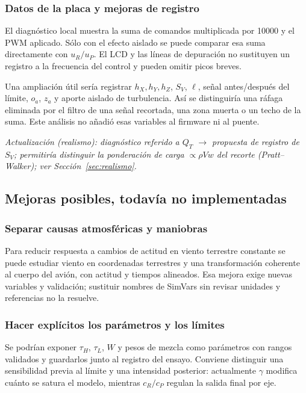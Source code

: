 \documentclass[11pt,a4paper]{article}
\newcommand{\code}[1]{\texttt{\detokenize{#1}}}
\begin{document}
\subsubsection{Datos de la placa y mejoras de registro}
El diagnóstico local \code{f=} muestra la suma de comandos multiplicada por 10000 y \code{p=} el PWM aplicado. Sólo con el efecto aislado se puede comparar esa suma directamente con $u_R/u_P$. El LCD y las líneas de depuración no sustituyen un registro a la frecuencia del control y pueden omitir picos breves.

Una ampliación útil sería registrar $h_X,h_Y,h_Z$, $S_V$, $\ell$, señal antes/después del límite, $o_a$, $z_a$ y aporte aislado de turbulencia. Así se distinguiría una ráfaga eliminada por el filtro de una señal recortada, una zona muerta o un techo de la suma. Este análisis no añadió esas variables al firmware ni al puente.

\textit{Actualización (realismo): diagnóstico referido a $Q_T$ $\rightarrow$ propuesta de registro de $S_V$; permitiría distinguir la ponderación de carga $\propto\rho Vw$ del recorte (Pratt--Walker); ver Sección~\ref{sec:realismo}.}

\subsection{Mejoras posibles, todavía no implementadas}
\subsubsection{Separar causas atmosféricas y maniobras}
Para reducir respuesta a cambios de actitud en viento terrestre constante se puede estudiar viento en coordenadas terrestres y una transformación coherente al cuerpo del avión, con actitud y tiempos alineados. Esa mejora exige nuevas variables y validación; sustituir nombres de SimVars sin revisar unidades y referencias no la resuelve.

\subsubsection{Hacer explícitos los parámetros y los límites}
Se podrían exponer $\tau_H$, $\tau_L$, $W$ y pesos de mezcla como parámetros con rangos validados y guardarlos junto al registro del ensayo. Conviene distinguir una sensibilidad previa al límite y una intensidad posterior: actualmente $\gamma$ modifica cuánto se satura el modelo, mientras $c_R/c_P$ regulan la salida final por eje.
\end{document}
